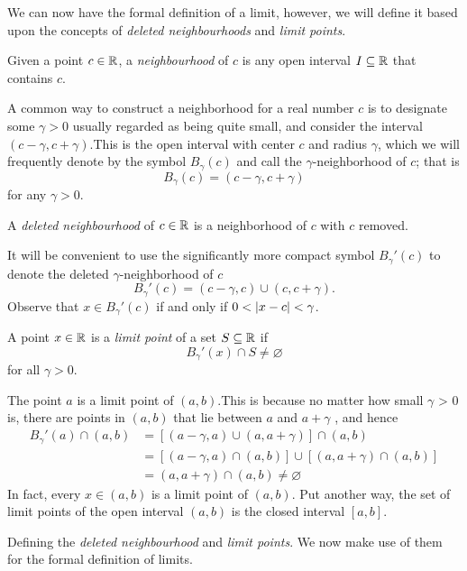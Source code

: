 We can now have the formal definition of a limit, however, we will define it
based upon the concepts of \emph{ deleted neighbourhoods} and \emph{limit
points}.
\begin{defi}[Neighbourhood]
     Given a point $c \in \mathbb{R}$, a \emph{neighbourhood} of $c$ is any open interval 
     $I \subseteq \mathbb{R}$ that contains $c$.

     A common way to construct a neighborhood for a real number $c$ is to
     designate some $\gamma > 0$ usually regarded as being quite small, and
     consider the interval $(c-\gamma,c+\gamma)$.This is the open interval
     with center $c$ and radius $\gamma$, which we will frequently denote by
     the symbol $B_\gamma(c)$ and call the $\gamma$-neighborhood of $c$;
     that is
     \begin{equation*}
         B_\gamma(c) = (c-\gamma,c+\gamma)
     \end{equation*}
     for any $\gamma  >0$.
\end{defi}
\begin{defi}
     A \emph{deleted neighbourhood} of $c \in \mathbb{R}$ is a neighborhood of $c$ with
     $c$ removed.
     
     It will be convenient to use the significantly more compact
     symbol $B_\gamma'(c)$ to denote the deleted $\gamma$-neighborhood of $c$
    \begin{equation*}
        B_\gamma'(c) =(c-\gamma,c) \cup (c,c+\gamma).
    \end{equation*}
    Observe that $x \in B_\gamma'(c)$ if and only if $0<\left\lvert x-c\right\rvert<\gamma$.    
\end{defi}
\begin{defi}
     A point $x \in \mathbb{R}$ is a \emph{limit point} of a set $S\subseteq\mathbb{R}$ if
     \begin{equation*}
        B_\gamma'(x) \cap S \neq \varnothing 
     \end{equation*}
     for all $\gamma>0$.
\end{defi}
\begin{eg}
     The point $a$ is a limit point of $(a,b)$.This is because no matter how small $\gamma$ > 0
     is, there are points in $(a, b)$ that lie between $a$ and $a + \gamma$ , and hence
     \begin{align*}
         B_\gamma'(a) \cap (a,b) &= \left[ (a-\gamma,a) \cup (a,a+\gamma)\right]
         \cap (a,b) \\
         &= \left[ (a-\gamma,a) \cap (a,b)\right] \cup \left[ (a,a+\gamma) \cap 
         (a,b)\right] \\
         &= (a,a+\gamma) \cap (a,b) \neq \varnothing
     \end{align*}
     In fact, every $x \in (a, b)$ is a limit point of $(a, b)$. Put another way, the
set of limit points of the open interval $(a, b)$ is the closed interval $[a, b]$.
\end{eg}
Defining the \emph{deleted neighbourhood} and \emph{limit points}. We now make use
of them for the formal definition of limits.

